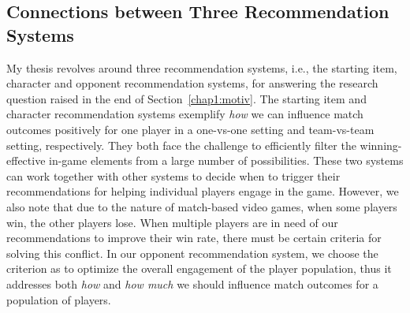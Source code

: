 




\subsection{Connections between Three Recommendation Systems}

My thesis revolves around three recommendation systems, i.e., the starting item, character and opponent recommendation systems, for answering the research question raised in the end of Section~\ref{chap1:motiv}. The starting item and character recommendation systems exemplify \textit{how} we can influence match outcomes positively for one player in a one-vs-one setting and team-vs-team setting, respectively. They both face the challenge to efficiently filter the winning-effective in-game elements from a large number of possibilities. These two systems can work together with other systems to decide when to trigger their recommendations for helping individual players engage in the game. However, we also note that due to the nature of match-based video games, when some players win, the other players lose. When multiple players are in need of our recommendations to improve their win rate, there must be certain criteria for solving this conflict. In our opponent recommendation system, we choose the criterion as to optimize the overall engagement of the player population, thus it addresses both \textit{how} and \textit{how much} we should influence match outcomes for a population of players. 


